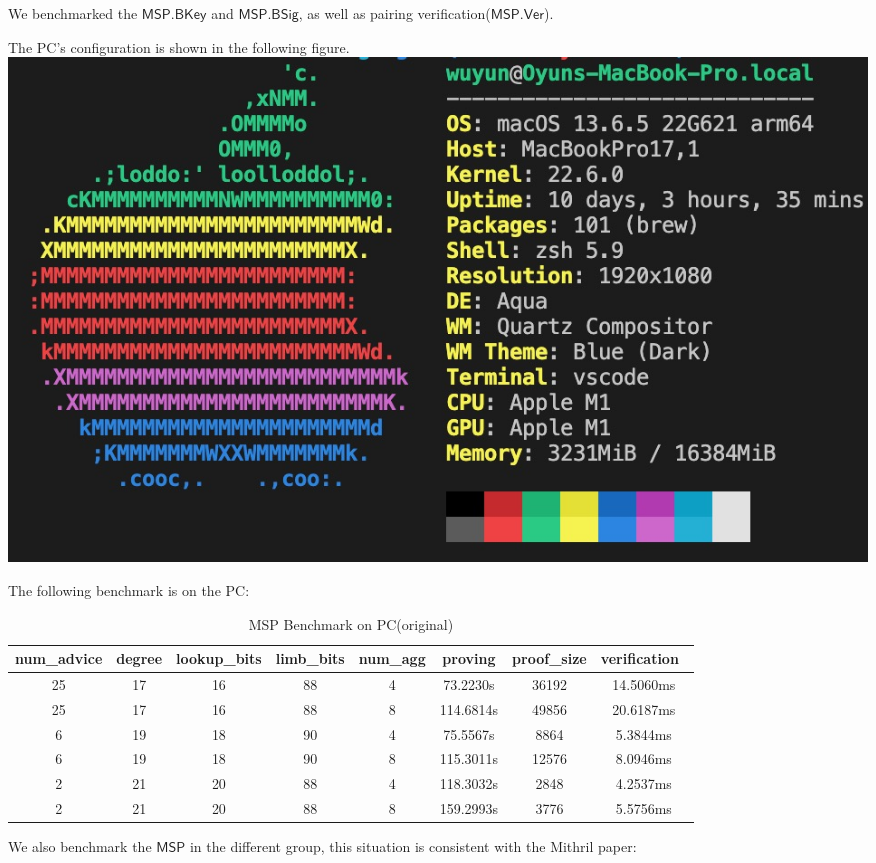 \documentclass{article}
\begin{document}
We benchmarked the $\mathsf{MSP.BKey}$ and $\mathsf{MSP.BSig}$, as well as pairing verification($\mathsf{MSP.Ver}$).

The PC's configuration is shown in the following figure.\\

\includegraphics[width=0.9\linewidth]{wuyun_mac.jpg}

The following benchmark is on the PC:\\
\begin{table}[ht]
    \centering
    \begin{tabular}{c|c|c|c|c|c|c|c}
        \toprule  
        num\_advice & degree & lookup\_bits & limb\_bits  & num\_agg  & proving & proof\_size & verification\ \\
        \midrule
        25 & 17 & 16 & 88  & 4   & 73.2230s   & 36192 & 14.5060ms \\
        25 & 17 & 16 & 88  & 8  & 114.6814s  & 49856 & 20.6187ms \\
        6  & 19 & 18 & 90 & 4   & 75.5567s   & 8864  & 5.3844ms  \\
        6  & 19 & 18 & 90  & 8  & 115.3011s    & 12576 & 8.0946ms  \\
        2  & 21 & 20 & 88  & 4   & 118.3032s  & 2848  & 4.2537ms  \\
        2  & 21 & 20 & 88  & 8  & 159.2993s  & 3776  & 5.5756ms  \\
        \bottomrule
    \end{tabular}
    \caption{MSP Benchmark on PC(original)}
    \label{tab:data_table}
\end{table}




We also benchmark the $\mathsf{MSP}$ in the different group, this situation is consistent with the Mithril paper:
\end{document}

